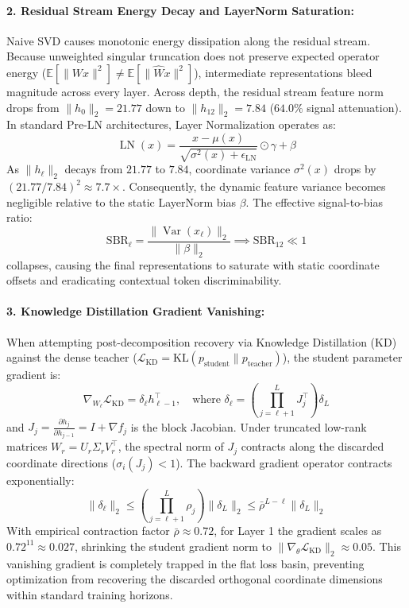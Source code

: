 \documentclass{article}
\begin{document}
\paragraph{2. Residual Stream Energy Decay and LayerNorm Saturation:}
Naive SVD causes monotonic energy dissipation along the residual stream. Because unweighted singular truncation does not preserve expected operator energy ($\mathbb{E}[\|W x\|^2] \neq \mathbb{E}[\|\hat{W} x\|^2]$), intermediate representations bleed magnitude across every layer. Across depth, the residual stream feature norm drops from $\|h_0\|_2 = 21.77$ down to $\|h_{12}\|_2 = 7.84$ ($64.0\%$ signal attenuation).
In standard Pre-LN architectures, Layer Normalization operates as:
\begin{equation}
    \operatorname{LN}(x) = \frac{x - \mu(x)}{\sqrt{\sigma^2(x) + \epsilon_{\text{LN}}}} \odot \gamma + \beta
\end{equation}
As $\|h_\ell\|_2$ decays from $21.77$ to $7.84$, coordinate variance $\sigma^2(x)$ drops by $(21.77/7.84)^2 \approx 7.7\times$. Consequently, the dynamic feature variance becomes negligible relative to the static LayerNorm bias $\beta$. The effective signal-to-bias ratio:
\begin{equation}
    \text{SBR}_\ell = \frac{\|\operatorname{Var}(x_\ell)\|_2}{\|\beta\|_2} \implies \text{SBR}_{12} \ll 1
\end{equation}
collapses, causing the final representations to saturate with static coordinate offsets and eradicating contextual token discriminability.

\paragraph{3. Knowledge Distillation Gradient Vanishing:}
When attempting post-decomposition recovery via Knowledge Distillation (KD) against the dense teacher ($\mathcal{L}_{\text{KD}} = \text{KL}(p_{\text{student}} \parallel p_{\text{teacher}})$), the student parameter gradient is:
\begin{equation}
    \nabla_{W_\ell} \mathcal{L}_{\text{KD}} = \delta_\ell h_{\ell-1}^\top, \quad \text{where } \delta_\ell = \left(\prod_{j=\ell+1}^L J_j^\top\right) \delta_L
\end{equation}
and $J_j = \frac{\partial h_j}{\partial h_{j-1}} = I + \nabla f_j$ is the block Jacobian.
Under truncated low-rank matrices $W_r = U_r \Sigma_r V_r^\top$, the spectral norm of $J_j$ contracts along the discarded coordinate directions ($\sigma_i(J_j) < 1$). The backward gradient operator contracts exponentially:
\begin{equation}
    \|\delta_\ell\|_2 \le \left(\prod_{j=\ell+1}^L \rho_j\right) \|\delta_L\|_2 \le \bar{\rho}^{L-\ell} \|\delta_L\|_2
\end{equation}
With empirical contraction factor $\bar{\rho} \approx 0.72$, for Layer 1 the gradient scales as $0.72^{11} \approx 0.027$, shrinking the student gradient norm to $\|\nabla_\theta \mathcal{L}_{\text{KD}}\|_2 \approx 0.05$. This vanishing gradient is completely trapped in the flat loss basin, preventing optimization from recovering the discarded orthogonal coordinate dimensions within standard training horizons.
\end{document}
